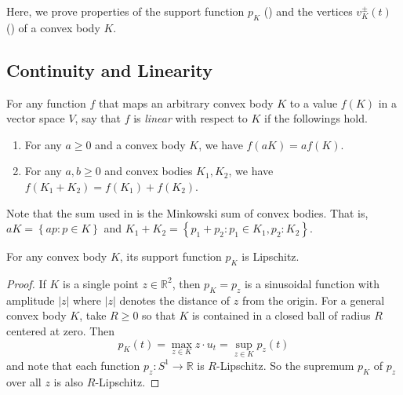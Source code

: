 Here, we prove properties of the support function \(p_K\) () and the vertices \(v_K^{\pm}(t)\) () of a convex body \(K\).

\subsection{Continuity and Linearity}

\begin{definition}

For any function \(f\) that maps an arbitrary convex body \(K\) to a value \(f(K)\) in a vector space \(V\), say that \(f\) is \emph{linear} with respect to \(K\) if the followings hold.

\begin{enumerate}
\def\labelenumi{\arabic{enumi}.}
\tightlist
\item
  For any \(a \geq 0\) and a convex body \(K\), we have \(f(aK) = a f(K)\).
\item
  For any \(a, b \geq 0\) and convex bodies \(K_1, K_2\), we have \(f(K_1 + K_2) = f(K_1) + f(K_2)\).
\end{enumerate}

\label{def:convex-body-linear}
\end{definition}

Note that the sum used in  is the Minkowski sum of convex bodies. That is, \(aK = \left\{ ap : p \in K \right\}\) and \(K_1 + K_2 = \left\{ p_1 + p_2 : p_1 \in K_1, p_2 : K_2 \right\}\).

\begin{theorem}

For any convex body \(K\), its support function \(p_K\) is Lipschitz.

\label{thm:support-function-lipschitz}
\end{theorem}

\begin{proof}
If \(K\) is a single point \(z \in \mathbb{R}^{2}\), then \(p_K = p_z\) is a sinusoidal function with amplitude \(|z|\) where \(|z|\) denotes the distance of \(z\) from the origin. For a general convex body \(K\), take \(R \geq 0\) so that \(K\) is contained in a closed ball of radius \(R\) centered at zero. Then
\[
p_K(t) = \max_{z \in K} z \cdot u_t = \sup_{z \in K} p_z(t)
\]
and note that each function \(p_z : S^1 \to \mathbb{R}\) is \(R\)-Lipschitz. So the supremum \(p_K\) of \(p_z\) over all \(z\) is also \(R\)-Lipschitz.
\end{proof}

